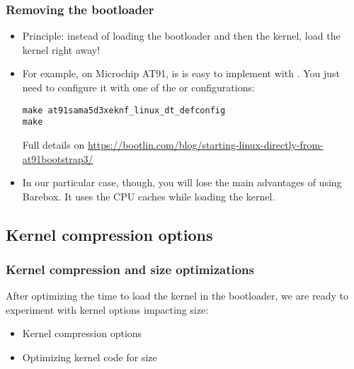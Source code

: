 \begin{frame}[fragile]
\frametitle{Removing the bootloader}
\begin{itemize}
\item Principle: instead of loading the bootloader and then the kernel,
      load the kernel right away!
\item For example, on Microchip AT91, is is easy to implement with
      . You just need to configure it
      with one of the  or  configurations:
\begin{block}{}
\begin{verbatim}
make at91sama5d3xeknf_linux_dt_defconfig
make
\end{verbatim}
\end{block}
      Full details on
      \url{https://bootlin.com/blog/starting-linux-directly-from-at91bootstrap3/}

\item In our particular case, though, you will lose the
      main advantages of using Barebox.  It uses the CPU caches
      while loading the kernel.
\end{itemize}
\end{frame}

\subsection{Kernel compression options}

\begin{frame}
\frametitle{Kernel compression and size optimizations}
After optimizing the time to load the kernel in the
bootloader, we are ready to experiment with kernel
options impacting size:
\begin{itemize}
\item Kernel compression options
\item Optimizing kernel code for size
\end{itemize}
\end{frame}

